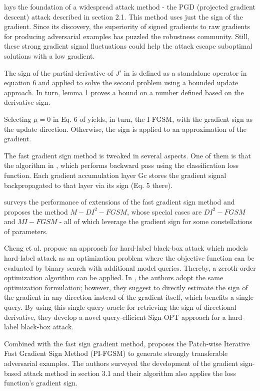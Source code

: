 \documentclass[11pt]{book}
\begin{document}
\cite{madry2017towards} lays the foundation of a widespread attack
method - the PGD (projected gradient descent) attack described in
section 2.1. This method uses just the sign of the gradient. Since
its discovery, the superiority of signed gradients to raw gradients
for producing adversarial examples has puzzled the robustness community.
Still, these strong gradient signal fluctuations could help the attack
escape suboptimal solutions with a low gradient.

The sign of the partial derivative of $J'$ in \cite{ma2017adversarial}
is defined as a standalone operator in equation 6 and applied to solve
the second problem using a bounded update approach. In turn, lemma
1 proves a bound on a number defined based on the derivative sign.

Selecting $\mu=0$ in Eq. 6 of \cite{dong2018boosting} yields, in
turn, the I-FGSM, with the gradient sign as the update direction.
Otherwise, the sign is applied to an approximation of the gradient.

The fast gradient sign method is tweaked in several aspects. One of
them is that the algorithm in \cite{sankaranarayanan2018regularizing},
which performs backward pass using the classification loss function.
Each gradient accumulation layer Gc stores the gradient signal backpropagated
to that layer via its sign (Eq. 5 there).

\cite{xie2019improving} surveys the performance of extensions of
the fast gradient sign method and proposes the method $M-DI^{2}-FGSM$,
whose special cases are $DI^{2}-FGSM$ and $MI-FGSM$ - all of which
leverage the gradient sign for some constellations of parameters.

Cheng et al. propose an approach for hard-label black-box attack which
models hard-label attack as an optimization problem where the objective
function can be evaluated by binary search with additional model queries.
Thereby, a zeroth-order optimization algorithm can be applied. In
\cite{cheng2019sign}, the authors adopt the same optimization formulation;
however, they suggest to directly estimate the sign of the gradient
in any direction instead of the gradient itself, which benefits a
single query. By using this single query oracle for retrieving the
sign of directional derivative, they develop a novel query-efficient
Sign-OPT approach for a hard-label black-box attack.

Combined with the fast sign gradient method, \cite{gao2020patch}
proposes the Patch-wise Iterative Fast Gradient Sign Method (PI-FGSM)
to generate strongly transferable adversarial examples. The authors
surveyed the development of the gradient sign-based attack method
in section 3.1 and their algorithm also applies the loss function's
gradient sign.
\end{document}
